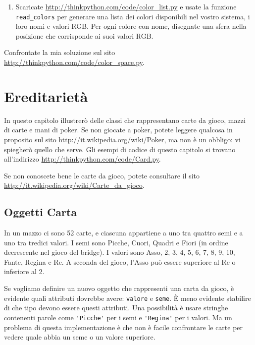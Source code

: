\documentclass[10pt]{book}
\begin{document}
\begin{exercise}
\begin{enumerate}
\item Scaricate \url{http://thinkpython.com/code/color_list.py}
e usate la funzione \verb"read_colors" per generare una lista dei colori disponibili nel vostro sistema, i loro nomi e valori RGB. Per ogni colore con nome, disegnate una sfera nella posizione che corrisponde ai suoi valori RGB.



\end{enumerate}

Confrontate la mia soluzione sul sito \url{http://thinkpython.com/code/color_space.py}.

\end{exercise}


\chapter{Ereditarietà}

In questo capitolo illustrerò delle classi che rappresentano carte da gioco, mazzi di carte e mani di poker. Se non giocate a poker, potete leggere qualcosa in proposito sul sito \url{http://it.wikipedia.org/wiki/Poker}, ma non è un obbligo: vi spiegherò quello che serve. Gli esempi di codice di questo capitolo si trovano all'indirizzo
\url{http://thinkpython.com/code/Card.py}.

Se non conoscete bene le carte da gioco, potete consultare il sito \url{http://it.wikipedia.org/wiki/Carte_da_gioco}.


\section{Oggetti Carta}

In un mazzo ci sono 52 carte, e ciascuna appartiene a uno tra quattro semi e a uno tra tredici valori. I semi sono Picche, Cuori, Quadri e Fiori (in ordine decrescente nel gioco del bridge). I valori sono Asso, 2, 3, 4, 5, 6, 7, 8, 9, 10, Fante, Regina e Re. A seconda del gioco, l'Asso può essere superiore al Re o inferiore al 2.

Se vogliamo definire un nuovo oggetto che rappresenti una carta da gioco, è evidente quali attributi dovrebbe avere: {\tt valore} e
{\tt seme}.  È meno evidente stabilire di che tipo devono essere questi attributi. Una possibilità è usare stringhe contenenti parole come
\verb"'Picche'" per i semi e \verb"'Regina'" per i valori. Ma un problema di questa implementazione è che non è facile confrontare le carte per vedere quale abbia un seme o un valore superiore.
\end{document}

